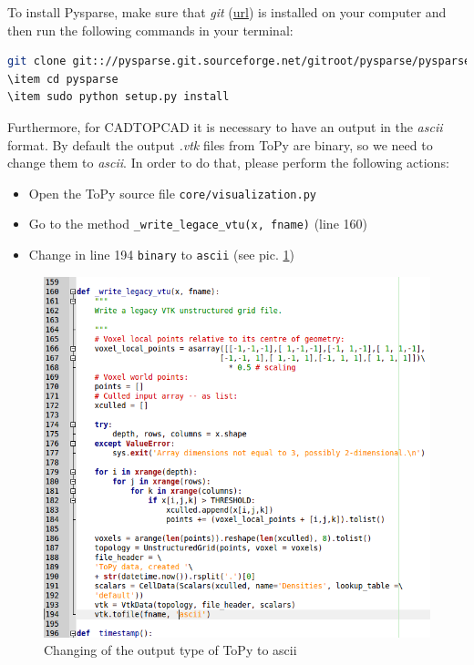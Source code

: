 \documentclass[11pt,a4paper,bibtotoc,idxtotoc,headsepline,footsepline,footexclude,DIV13,oneside]{scrbook}
\begin{document}
	To install Pysparse, make sure that \textit{git} (\href{https://git-scm.com/}{url}) is installed on your computer and then run the following commands in your terminal:
\begin{lstlisting}[language=bash]
git clone git:://pysparse.git.sourceforge.net/gitroot/pysparse/pysparse/
\item cd pysparse
\item sudo python setup.py install	
\end{lstlisting}	
	
	Furthermore, for CADTOPCAD it is necessary to have an output in the \textit{ascii} format. By default the output \textit{.vtk} files from ToPy are binary, so we need to change them to \textit{ascii}. In order to do that, please perform the following actions:
	\begin{itemize}
 		\item Open the ToPy source file \texttt{core/visualization.py}
 		\item Go to the method \texttt{{\_}write{\_}legace{\_}vtu(x, fname)} (line 160)
 		\item Change in line 194 \texttt{binary} to \texttt{ascii} (see pic. \ref{fig:ToPy_CodeChange})
	\end{itemize} 
	\begin{figure}
	\centering
	\includegraphics[scale=0.5]{img/ToPy_CodeChange.png}
	\caption{Changing of the output type of ToPy to ascii}
	\label{fig:ToPy_CodeChange}
	\end{figure}
	
\end{document}
